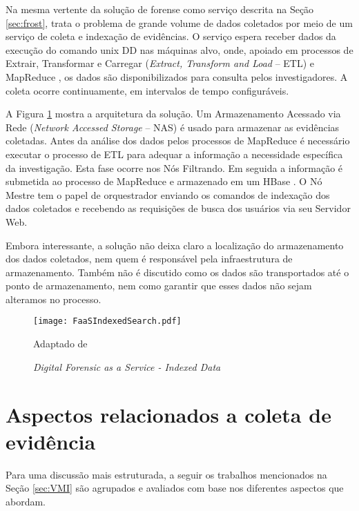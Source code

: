 Na mesma vertente da solução de forense como serviço descrita na Seção \ref{sec:frost}, \cite{FaaSIndexedSearch:2012} trata o problema de grande volume de dados coletados por meio de um serviço de coleta e indexação de evidências.
%
O serviço espera receber dados da execução do comando unix DD \cite{UnixManPagesDD} nas máquinas alvo, onde, apoiado em processos de Extrair, Transformar e Carregar (\textit{Extract, Transform and Load} -- ETL) e MapReduce \cite{WikipediaMapReduce}, os dados são disponibilizados para consulta pelos investigadores.
%
A coleta ocorre continuamente, em intervalos de tempo configuráveis.


A Figura \ref{fig:FaaSIndexedSearch} mostra a arquitetura da solução. Um Armazenamento Acessado via Rede (\textit{Network Accessed Storage} -- NAS) é usado para armazenar as evidências coletadas.
%
Antes da análise dos dados pelos processos de MapReduce é necessário executar o processo de ETL para adequar a informação a necessidade específica da investigação. Esta fase ocorre nos Nós Filtrando.
%
Em seguida a informação é submetida ao processo de MapReduce e armazenado em um HBase \cite{Hbase2018}.
%
O Nó Mestre tem o papel de orquestrador enviando os comandos de indexação dos dados coletados e recebendo as requisições de busca dos usuários via seu Servidor Web.


Embora interessante, a solução não deixa claro a localização do armazenamento dos dados coletados, nem quem é responsável pela infraestrutura de armazenamento.
%
Também não é discutido como os dados são transportados até o ponto de armazenamento, nem como garantir que esses dados não sejam alteramos no processo.
%


\begin{figure}[htb!]
\footnotesize
\caption{\textit{Digital Forensic as a Service - Indexed Data}}
\texttt{[image: FaaSIndexedSearch.pdf]}
\centering
\label{fig:FaaSIndexedSearch}
\begin{center}
Adaptado de \cite{FaaSIndexedSearch:2012} 
\end{center}
\end{figure}


\section{Aspectos relacionados a coleta de evidência}
\label{sec:coletadeevidencia}

Para uma discussão mais estruturada, a seguir os trabalhos mencionados na Seção \ref{sec:VMI} são agrupados e avaliados com base nos diferentes aspectos que abordam.

